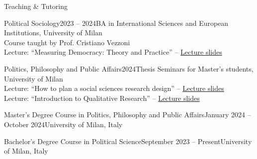 \documentclass{cv} %
\begin{document}
\begin{rSection}{Teaching \& Tutoring}

\subtitle{Guest Lectures}

\begin{rTeachingSection}{Political Sociology}{2023 -- 2024}{BA in International Sciences and European Institutions, University of Milan}\\ 
Course taught by Prof. Cristiano Vezzoni \\    
Lecture: “Measuring Democracy: Theory and Practice” -- \href{https://github.com/ste-sangiovanni/democracy_seminar}{Lecture slides}   
\end{rTeachingSection}
\begin{rTeachingSection}{Politics, Philosophy and Public Affairs}{2024}{Thesis Seminars for Master's students, University of Milan} \\ 
Lecture: “How to plan a social sciences research design” -- \href{https://github.com/ste-sangiovanni/PPPA_Thesis_Seminar}{Lecture slides}  \\ 
Lecture: “Introduction to Qualitative Research” -- \href{https://github.com/ste-sangiovanni/PPPA_Thesis_Seminar}{Lecture slides}   
\end{rTeachingSection}
    
\subtitle{Academic Tutoring \& Teaching Assistant}

\begin{rTeachingSection}{Master’s Degree Course in Politics, Philosophy and Public Affairs}{January 2024  -- October 2024}{University of Milan, Italy}
\end{rTeachingSection} 
\begin{rTeachingSection}{Bachelor’s Degree Course in Political Science}{September 2023 -- Present}{University of Milan, Italy}
\end{rTeachingSection} 
\end{rSection}
    
\newpage
\end{document}
